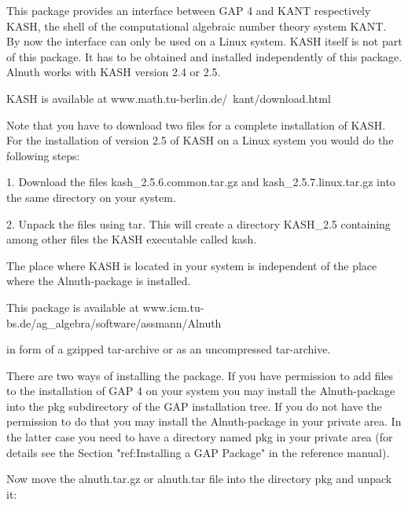

This package provides an interface between GAP 4 and KANT respectively
KASH, the shell of the computational algebraic number theory system KANT. By
now the interface can only be used on a Linux system.  KASH itself is not part
of this package.  It has to be obtained and installed independently of this
package. Alnuth works with KASH version 2.4 or 2.5.

 
KASH is available at
\begintt 
            www.math.tu-berlin.de/~kant/download.html
\endtt
 
Note that you have to download two files for a complete installation
of KASH. For the installation of version 2.5 of KASH on a Linux
system you would do the following steps:
\beginlist
\item{1.} Download the files
    kash_2.5.6.common.tar.gz and kash_2.5.7.linux.tar.gz
    into the same directory on your system.
 
\item{2.} Unpack the files using tar.  This will create a directory
    KASH_2.5 containing among other files the KASH executable called
    kash.

\endlist

The place where KASH is located in your system is independent of the place
 where the Alnuth-package is installed.

 
This package is available at
\begintt 
           www.icm.tu-bs.de/ag_algebra/software/assmann/Alnuth
\endtt 

in form of a gzipped tar-archive or as an uncompressed tar-archive.
 
There are two ways of installing the package.  If you have permission
to add files to the installation of GAP 4 on your system you may
install the Alnuth-package into the pkg subdirectory of the GAP
installation tree.  If you do not have the permission to do that you
may install the Alnuth-package in your private area. In the latter case you
need to have a directory named pkg in your private area (for details see
the Section "ref:Installing a GAP Package" in the reference manual). 

Now move the alnuth.tar.gz or alnuth.tar file into the directory pkg and
unpack it:

